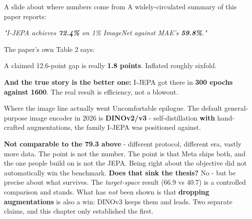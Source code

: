 \documentclass[aspectratio=169]{beamer}
\begin{document}
\begin{frame}{A slide about where numbers come from}
  \small
  A widely-circulated summary of this paper reports:
  \vskip 6pt
  \begin{center}
    \emph{"I-JEPA achieves \textbf{72.4\%} on 1\% ImageNet against MAE's
    \textbf{59.8\%}."}
  \end{center}
  \vskip 8pt
  The paper's own Table 2 says:
  \vskip 4pt
  \begin{center}
  \end{center}
  \vskip 8pt
  A claimed 12.6-point gap is really \textbf{1.8 points}. Inflated roughly sixfold.
  \vskip 8pt
  \begin{center}
    \small\color{armred}\textbf{And the true story is the better one:} I-JEPA got there
    in \textbf{300 epochs against 1600}. The real result is efficiency, not a blowout.
  \end{center}
\end{frame}

\begin{frame}{Where the image line actually went}
  \small
  Uncomfortable epilogue. The default general-purpose image encoder in 2026 is
  \textbf{DINOv2/v3} - self-distillation \textbf{with} hand-crafted augmentations, the
  family I-JEPA was positioned against.
  \vskip 8pt
  \begin{center}
  \end{center}
  \vskip 8pt
  \footnotesize
  \textbf{Not comparable to the 79.3 above} - different protocol, different era, vastly
  more data. The point is not the number. The point is that Meta ships both, and the one
  people build on is not the JEPA.
  \vskip 4pt
  \color{armred}Being right about the objective did not automatically win the benchmark.
  \vskip 6pt
  \color{black}\footnotesize
  \textbf{Does that sink the thesis?} No - but be precise about what survives. The
  \emph{target-space} result (66.9 vs 40.7) is a controlled comparison and stands. What has
  \emph{not} been shown is that \textbf{dropping augmentations} is also a win: DINOv3 keeps
  them and leads. Two separate claims, and this chapter only established the first.
\end{frame}
\end{document}
